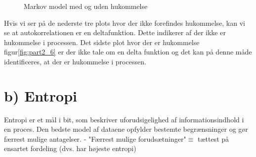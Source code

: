 \begin{figure}[!h]
	\centering
	\caption{Markov model med og uden hukommelse }
	\label{fig:part2_markov}
\end{figure}
Hvis vi ser på de nederste tre plots hvor der ikke forefindes hukommelse, kan vi se at autokorrelationen er en deltafunktion. Dette indikerer af der ikke er hukommelse i processen. Det sidste plot hvor der er hukommelse figur\ref{fig:part2_6} er der ikke tale om en delta funktion og det kan på denne måde identificeres, at der er hukommelse i processen. 

\newpage
\section{b) Entropi }
Entropi er et mål i bit, som beskriver uforudsigelighed af informationsindhold i en proces.
Den bedste model af dataene opfylder bestemte begrænsninger og gør færrest mulige antagelser.
- "Færrest mulige forudsætninger"$\equiv$ tættest på ensartet fordeling (dvs. har højeste entropi)

